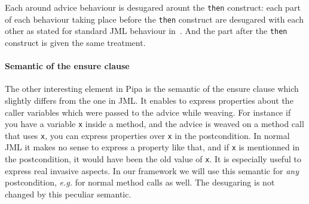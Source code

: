 Each around advice behaviour is desugared arount the {\tt then} construct: each part of each 
behaviour taking place before the {\tt then} construct are desugared with each other as 
stated for standard JML behaviour in~\cite{clifton02spectators}.
And the part after the {\tt then} construct is given the same treatment.

\paragraph{Semantic of the ensure clause}
The other interesting element in Pipa is the semantic of the ensure clause which slightly differs from the one in
JML. It enables to express properties about the caller variables which were passed to the advice while 
weaving. For instance if you have a variable {\tt x} inside a method, 
and the advice is weaved on a method call that uses {\tt x}, you can express properties over {\tt x} in the 
postcondition. In normal JML it makes no sense to express a property like that, and if {\tt x} is mentionned
in the postcondition, it would have been the old value of {\tt x}. It is especially useful to express real 
invasive aspects. In our framework we will use this semantic for {\it any} postcondition, {\it e.g.} 
for normal method calls as well.
The desugaring is not changed by this peculiar semantic.